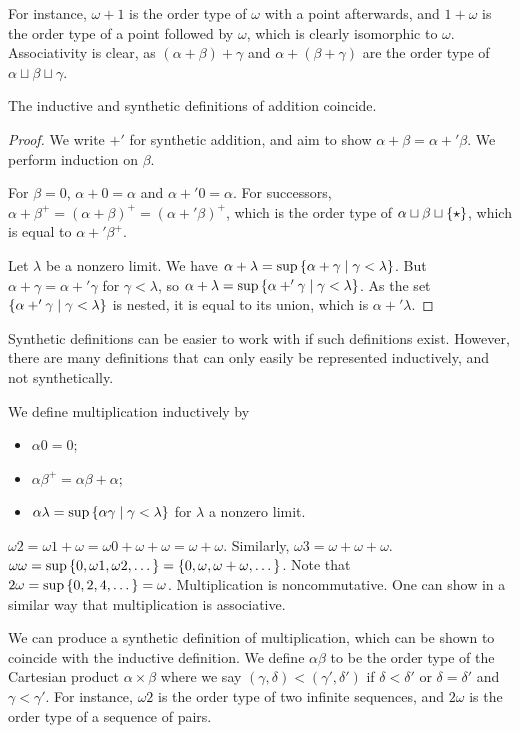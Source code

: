 For instance, \( \omega + 1 \) is the order type of \( \omega \) with a point afterwards, and \( 1 + \omega \) is the order type of a point followed by \( \omega \), which is clearly isomorphic to \( \omega \).
Associativity is clear, as \( (\alpha + \beta) + \gamma \) and \( \alpha + (\beta + \gamma) \) are the order type of \( \alpha \sqcup \beta \sqcup \gamma \).
\begin{proposition}
    The inductive and synthetic definitions of addition coincide.
\end{proposition}
\begin{proof}
    We write \( +' \) for synthetic addition, and aim to show \( \alpha + \beta = \alpha +' \beta \).
    We perform induction on \( \beta \).

    For \( \beta = 0 \), \( \alpha + 0 = \alpha \) and \( \alpha +' 0 = \alpha \).
    For successors, \( \alpha + \beta^+ = (\alpha + \beta)^+ = (\alpha +' \beta)^+ \), which is the order type of \( \alpha \sqcup \beta \sqcup \qty{\star} \), which is equal to \( \alpha +' \beta^+ \).

    Let \( \lambda \) be a nonzero limit.
    We have \( \alpha + \lambda = \sup\qty{\alpha + \gamma \mid \gamma < \lambda} \).
    But \( \alpha + \gamma = \alpha +' \gamma \) for \( \gamma < \lambda \), so \( \alpha + \lambda = \sup\qty{\alpha +' \gamma \mid \gamma < \lambda} \).
    As the set \( \qty{\alpha +' \gamma \mid \gamma < \lambda} \) is nested, it is equal to its union, which is \( \alpha +' \lambda \).
\end{proof}
Synthetic definitions can be easier to work with if such definitions exist.
However, there are many definitions that can only easily be represented inductively, and not synthetically.

We define multiplication inductively by
\begin{itemize}
    \item \( \alpha 0 = 0 \);
    \item \( \alpha \beta^+ = \alpha\beta + \alpha \);
    \item \( \alpha \lambda = \sup\qty{\alpha \gamma \mid \gamma < \lambda} \) for \( \lambda \) a nonzero limit.
\end{itemize}
\begin{example}
    \( \omega 2 = \omega 1 + \omega = \omega 0 + \omega + \omega = \omega + \omega \).
    Similarly, \( \omega 3 = \omega + \omega + \omega \).
    \( \omega \omega = \sup\qty{0, \omega 1, \omega 2, \dots} = \qty{0, \omega, \omega + \omega, \dots} \).
    Note that \( 2 \omega = \sup\qty{0, 2, 4, \dots} = \omega \).
    Multiplication is noncommutative.
    One can show in a similar way that multiplication is associative.
\end{example}
We can produce a synthetic definition of multiplication, which can be shown to coincide with the inductive definition.
We define \( \alpha \beta \) to be the order type of the Cartesian product \( \alpha \times \beta \) where we say \( (\gamma, \delta) < (\gamma', \delta') \) if \( \delta < \delta' \) or \( \delta = \delta' \) and \( \gamma < \gamma' \).
For instance, \( \omega 2 \) is the order type of two infinite sequences, and \( 2 \omega \) is the order type of a sequence of pairs.

